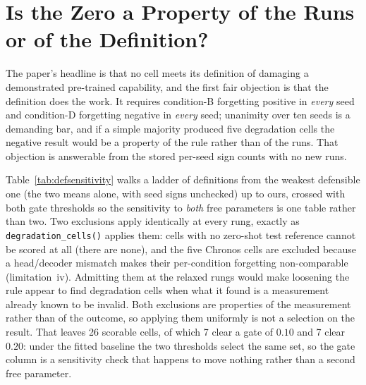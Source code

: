 \section{Is the Zero a Property of the Runs or of the Definition?}
\label{app:defsensitivity}

The paper's headline is that no cell meets its definition of damaging a
demonstrated pre-trained capability, and the first fair objection is that the
definition does the work. It requires condition-B forgetting positive in
\emph{every} seed and condition-D forgetting negative in \emph{every} seed;
unanimity over ten seeds is a demanding bar, and if a simple majority produced
five degradation cells the negative result would be a property of the rule rather
than of the runs. That objection is answerable from the stored per-seed sign
counts with no new runs.

Table~\ref{tab:defsensitivity} walks a ladder of definitions from the weakest
defensible one (the two means alone, with seed signs unchecked) up to ours,
crossed with both gate thresholds so the sensitivity to \emph{both} free
parameters is one table rather than two. Two exclusions apply identically at every
rung, exactly as \texttt{degradation\_cells()} applies them: cells with no
zero-shot test reference cannot be scored at all (there are none), and the five
Chronos cells are excluded because a head/decoder mismatch makes their
per-condition forgetting non-comparable (limitation~iv). Admitting them at the
relaxed rungs would make loosening the rule appear to find degradation cells when
what it found is a measurement already known to be invalid. Both exclusions are
properties of the measurement rather than of the outcome, so applying them
uniformly is not a selection on the result. That leaves 26 scorable cells, of
which 7 clear a gate of $0.10$ and 7 clear $0.20$: under the fitted baseline the
two thresholds select the same set, so the gate column is a sensitivity check that
happens to move nothing rather than a second free parameter.

\begin{table}[ht]
\centering\footnotesize
\caption{Degradation cells admitted under eight definitions and two gate
thresholds. Cells are named, not just counted. Under the corrected gate no cell is
admitted at $0.10$ alone, so the two columns agree throughout. The excluded confounded cells are
Chronos-T5-Small on ETTh1, ETTh2, ETTm2, Weather and Electricity. Emitted by
\texttt{scripts/degradation\_sensitivity.py}.}
\label{tab:defsensitivity}

\end{table}

